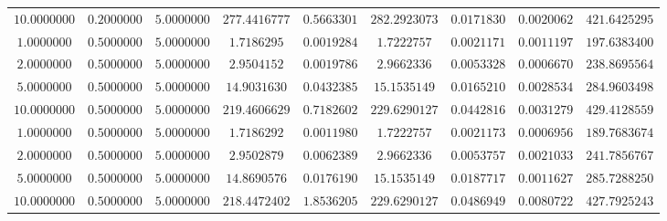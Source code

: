 \begin{tabular}{ccccccccc}
$10.0000000$ & $0.2000000$ & $5.0000000$ & $277.4416777$ & $0.5663301$ & $282.2923073$ & $0.0171830$ & $0.0020062$ & $421.6425295$\\
$1.0000000$ & $0.5000000$ & $5.0000000$ & $1.7186295$ & $0.0019284$ & $1.7222757$ & $0.0021171$ & $0.0011197$ & $197.6383400$\\
$2.0000000$ & $0.5000000$ & $5.0000000$ & $2.9504152$ & $0.0019786$ & $2.9662336$ & $0.0053328$ & $0.0006670$ & $238.8695564$\\
$5.0000000$ & $0.5000000$ & $5.0000000$ & $14.9031630$ & $0.0432385$ & $15.1535149$ & $0.0165210$ & $0.0028534$ & $284.9603498$\\
$10.0000000$ & $0.5000000$ & $5.0000000$ & $219.4606629$ & $0.7182602$ & $229.6290127$ & $0.0442816$ & $0.0031279$ & $429.4128559$\\
$1.0000000$ & $0.5000000$ & $5.0000000$ & $1.7186292$ & $0.0011980$ & $1.7222757$ & $0.0021173$ & $0.0006956$ & $189.7683674$\\
$2.0000000$ & $0.5000000$ & $5.0000000$ & $2.9502879$ & $0.0062389$ & $2.9662336$ & $0.0053757$ & $0.0021033$ & $241.7856767$\\
$5.0000000$ & $0.5000000$ & $5.0000000$ & $14.8690576$ & $0.0176190$ & $15.1535149$ & $0.0187717$ & $0.0011627$ & $285.7288250$\\
$10.0000000$ & $0.5000000$ & $5.0000000$ & $218.4472402$ & $1.8536205$ & $229.6290127$ & $0.0486949$ & $0.0080722$ & $427.7925243$\\
\end{tabular}
